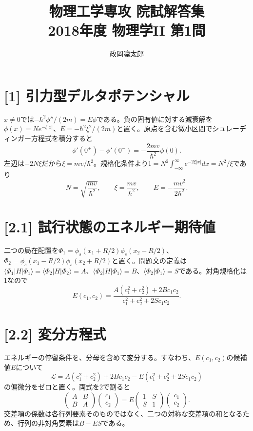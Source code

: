 \documentclass[11pt,a4paper]{article}
\title{物理工学専攻 院試解答集\\2018年度 物理学II 第1問}
\author{政岡凜太郎}
\date{}
\begin{document}
\maketitle

\section*{[1] 引力型デルタポテンシャル}
$x\ne0$では$-\hbar^2\phi''/(2m)=E\phi$である。負の固有値に対する減衰解を$\phi(x)=Ne^{-\xi|x|}$、$E=-\hbar^2\xi^2/(2m)$と置く。原点を含む微小区間でシュレーディンガー方程式を積分すると
\begin{equation}
 \phi'(0^+)-\phi'(0^-)=-\frac{2mv}{\hbar^2}\phi(0).
\end{equation}
左辺は$-2N\xi$だから$\xi=mv/\hbar^2$。規格化条件より$1=N^2\int_{-\infty}^{\infty}e^{-2\xi|x|}dx=N^2/\xi$であり
\begin{equation}
 \boxed{N=\sqrt{\frac{mv}{\hbar^2}}},\qquad
 \boxed{\xi=\frac{mv}{\hbar^2}},\qquad
 \boxed{E=-\frac{mv^2}{2\hbar^2}}.
\end{equation}

\section*{[2.1] 試行状態のエネルギー期待値}
二つの局在配置を$\Phi_1=\phi_s(x_1+R/2)\phi_s(x_2-R/2)$、$\Phi_2=\phi_s(x_1-R/2)\phi_s(x_2+R/2)$と置く。問題文の定義は$\langle\Phi_1|H|\Phi_1\rangle=\langle\Phi_2|H|\Phi_2\rangle=A$、$\langle\Phi_2|H|\Phi_1\rangle=B$、$\langle\Phi_2|\Phi_1\rangle=S$である。対角規格化は1なので
\begin{equation}
 \boxed{E(c_1,c_2)=\frac{A(c_1^2+c_2^2)+2Bc_1c_2}{c_1^2+c_2^2+2Sc_1c_2}}.
\end{equation}

\section*{[2.2] 変分方程式}
エネルギーの停留条件を、分母を含めて変分する。すなわち、$E(c_1,c_2)$の候補値$E$について
\begin{equation}
 \mathcal L=A(c_1^2+c_2^2)+2Bc_1c_2
 -E(c_1^2+c_2^2+2Sc_1c_2)
\end{equation}
の偏微分をゼロと置く。両式を2で割ると
\begin{equation}
 \boxed{\begin{pmatrix}A&B\\B&A\end{pmatrix}
 \begin{pmatrix}c_1\\c_2\end{pmatrix}
 =E\begin{pmatrix}1&S\\S&1\end{pmatrix}
 \begin{pmatrix}c_1\\c_2\end{pmatrix}}.
\end{equation}
交差項の係数は各行列要素そのものではなく、二つの対称な交差項の和となるため、行列の非対角要素は$B-ES$である。
\end{document}
